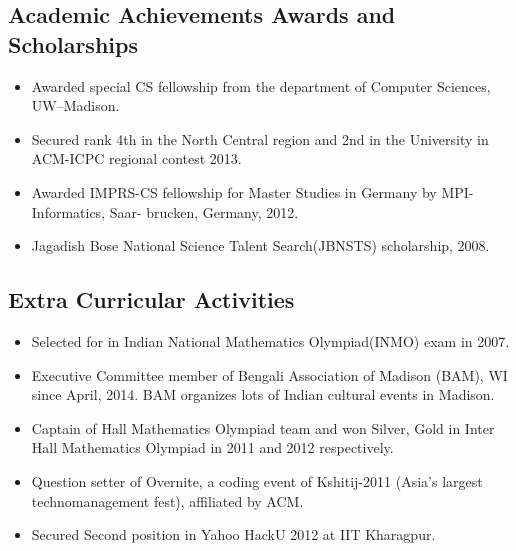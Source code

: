 \subsection*{Academic Achievements Awards and
Scholarships}\label{academic-achievements-awards-and-scholarships}

\begin{itemize}
\tightlist
\item
  Awarded special CS fellowship from the department of Computer
  Sciences, UW--Madison.
\item Secured rank 4th in the North Central region
  and 2nd in the University in ACM-ICPC regional contest 2013.
\item
  Awarded IMPRS-CS fellowship for Master Studies in Germany by
  MPI-Informatics, Saar- brucken, Germany, 2012.
\item
  Jagadish Bose National Science Talent Search(JBNSTS) scholarship,
  2008.
\end{itemize}

\subsection*{Extra Curricular
Activities}\label{extra-curricular-activities}

\begin{itemize}
\tightlist
\item
  Selected for in Indian National Mathematics Olympiad(INMO) exam in
  2007.
\item
  Executive Committee member of Bengali Association of Madison (BAM), WI
  since April, 2014. BAM organizes lots of Indian cultural events in
  Madison.
\item
  Captain of Hall Mathematics Olympiad team and won Silver, Gold in
  Inter Hall Mathematics Olympiad in 2011 and 2012 respectively.
\item
  Question setter of Overnite, a coding event of Kshitij-2011 (Asia's
  largest technomanagement fest), affiliated by ACM.
\item
  Secured Second position in Yahoo HackU 2012 at IIT Kharagpur.
\end{itemize}

% 

